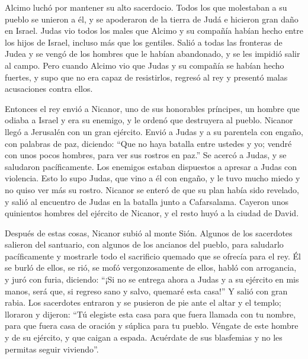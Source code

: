  Alcimo luchó por mantener su alto sacerdocio.
 Todos los que molestaban a su pueblo se unieron a él, y
se apoderaron de la tierra de Judá e hicieron gran daño en Israel.
 Judas vio todos los males que Alcimo y su compañía
habían hecho entre los hijos de Israel, incluso más que los gentiles.
 Salió a todas las fronteras de Judea y se vengó de los
hombres que le habían abandonado, y se les impidió salir al campo.
 Pero cuando Alcimo vio que Judas y su compañía se habían
hecho fuertes, y supo que no era capaz de resistirlos, regresó al rey y
presentó malas acusaciones contra ellos.

 Entonces el rey envió a Nicanor, uno de sus honorables
príncipes, un hombre que odiaba a Israel y era su enemigo, y le ordenó
que destruyera al pueblo.  Nicanor llegó a Jerusalén con
un gran ejército. Envió a Judas y a su parentela con engaño, con
palabras de paz, diciendo:  ``Que no haya batalla entre
ustedes y yo; vendré con unos pocos hombres, para ver sus rostros en
paz.''  Se acercó a Judas, y se saludaron pacíficamente.
Los enemigos estaban dispuestos a apresar a Judas con violencia.
 Esto lo supo Judas, que vino a él con engaño, y le tuvo
mucho miedo y no quiso ver más su rostro.  Nicanor se
enteró de que su plan había sido revelado, y salió al encuentro de Judas
en la batalla junto a Cafarsalama.  Cayeron unos
quinientos hombres del ejército de Nicanor, y el resto huyó a la ciudad
de David.

 Después de estas cosas, Nicanor subió al monte Sión.
Algunos de los sacerdotes salieron del santuario, con algunos de los
ancianos del pueblo, para saludarlo pacíficamente y mostrarle todo el
sacrificio quemado que se ofrecía para el rey.  Él se
burló de ellos, se rió, se mofó vergonzosamente de ellos, habló con
arrogancia,  y juró con furia, diciendo: ``¡Si no se
entrega ahora a Judas y a su ejército en mis manos, será que, si regreso
sano y salvo, quemaré esta casa!'' Y salió con gran rabia.
 Los sacerdotes entraron y se pusieron de pie ante el
altar y el templo; lloraron y dijeron:  ``Tú elegiste
esta casa para que fuera llamada con tu nombre, para que fuera casa de
oración y súplica para tu pueblo.  Véngate de este hombre
y de su ejército, y que caigan a espada. Acuérdate de sus blasfemias y
no les permitas seguir viviendo''.


